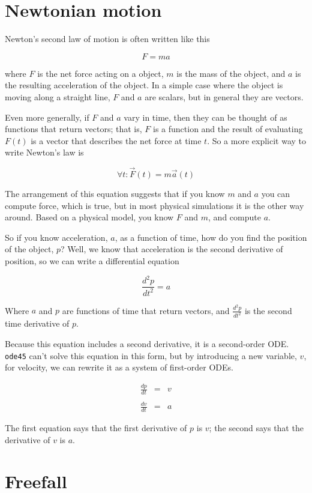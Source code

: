 \documentclass{book}
\begin{document}
\section{Newtonian motion}

Newton's second law of motion is often written like this

\[ F = ma \]

where $F$ is the net force acting on a object, $m$ is the mass
of the object, and $a$ is the resulting acceleration of the object.
In a simple case where the object is moving along a straight line,
$F$ and $a$ are scalars, but in general they are vectors.

Even more generally, if $F$ and $a$ vary in time, then they can
be thought of as functions that return vectors; that is, $F$ is
a function and the result of evaluating $F(t)$ is a vector that
describes the net force at time $t$.  So a more explicit way to
write Newton's law is

\[ \forall t: \vec{F}(t) = m \vec{a}(t) \]

The arrangement of this equation suggests that if you know $m$ and $a$
you can compute force, which is true, but in most physical
simulations it is the other way around.  Based on a physical
model, you know $F$ and $m$, and compute $a$.

So if you know acceleration, $a$, as a function of time, how do you
find the position of the object, $p$?  Well, we know that acceleration
is the second derivative of position, so we can write a differential
equation


\[ \frac{d^2p}{dt^2} = a\]


Where $a$ and $p$ are functions of time that return vectors,
and $\frac{d^2p}{dt^2}$ is the second time derivative of $p$.

Because this equation includes a second derivative, it is a second-order
ODE.  {\tt ode45} can't solve this equation in this form, but by
introducing a new variable, $v$, for velocity, we can rewrite it as
a system of first-order ODEs.

\begin{eqnarray*}
\frac{dp}{dt} &=& v \\
\\
\frac{dv}{dt} &=& a
\end{eqnarray*}

The first equation says that the first derivative of $p$ is $v$; the
second says that the derivative of $v$ is $a$.


\section{Freefall}
\label{freefall}
\end{document}

